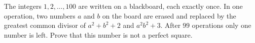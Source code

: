 The integers $1,2,\dots,100$ are written on a blackboard, each exactly once. In one operation, two numbers $a$ and $b$ on the board are erased and replaced by the greatest common divisor of $a^2+b^2+2$ and $a^2b^2+3$. After $99$ operations only one number is left. Prove that this number is not a perfect square.
